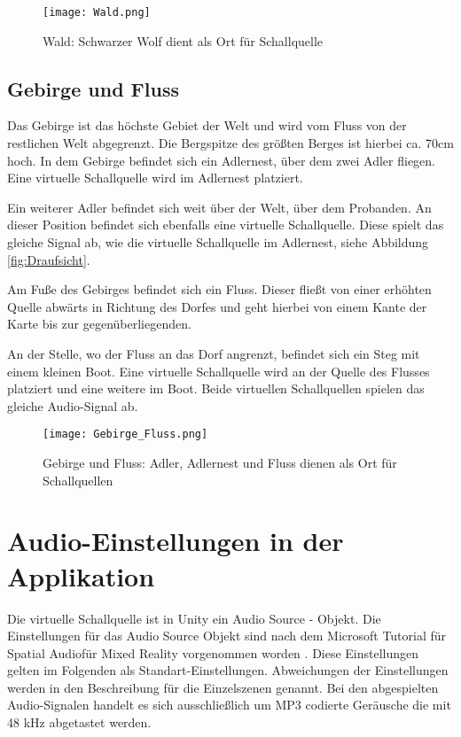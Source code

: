  \begin{figure}[H]
\centering
\texttt{[image: Wald.png]}
\caption{Wald: Schwarzer Wolf dient als Ort für Schallquelle}
\label{fig:Wald}
\end{figure} 

\subsection{Gebirge und Fluss}
Das Gebirge ist das höchste Gebiet der Welt und wird vom Fluss von der restlichen Welt abgegrenzt. Die Bergspitze des größten Berges ist hierbei ca. 70cm hoch. In dem Gebirge befindet sich ein Adlernest, über dem zwei Adler fliegen. Eine virtuelle Schallquelle wird im Adlernest platziert. 

   Ein weiterer Adler befindet sich weit über der Welt, über dem Probanden. An dieser Position befindet sich ebenfalls eine virtuelle Schallquelle. Diese spielt das gleiche Signal ab, wie die virtuelle Schallquelle im Adlernest, siehe Abbildung \ref{fig:Draufsicht}. 

Am Fuße des Gebirges befindet sich ein Fluss. Dieser fließt von einer erhöhten Quelle abwärts in Richtung des Dorfes und geht hierbei von einem Kante der Karte bis zur gegenüberliegenden. 

An der Stelle, wo der Fluss an das Dorf angrenzt, befindet sich ein Steg mit einem kleinen Boot. Eine virtuelle Schallquelle wird an der Quelle des Flusses platziert und eine weitere im Boot. Beide virtuellen Schallquellen spielen das gleiche Audio-Signal ab. 

 \begin{figure}[H]
\centering
\texttt{[image: Gebirge\_Fluss.png]}
\caption{Gebirge und Fluss: Adler, Adlernest und Fluss dienen als  Ort für Schallquellen}
\label{fig:GebirgeFluss}
\end{figure}
   
  
   
\section{Audio-Einstellungen in der Applikation}
Die virtuelle Schallquelle ist in Unity ein Audio Source - Objekt. Die Einstellungen für das Audio Source Objekt sind nach dem Microsoft Tutorial für \glqq Spatial Audio\grqq für Mixed Reality vorgenommen worden \cite{MSSpatialAudio}. Diese Einstellungen gelten im Folgenden als Standart-Einstellungen. Abweichungen der Einstellungen werden in den Beschreibung für die Einzelszenen genannt.  Bei den abgespielten Audio-Signalen handelt es sich ausschließlich um MP3 codierte Geräusche die mit 48 kHz abgetastet werden. 
  

